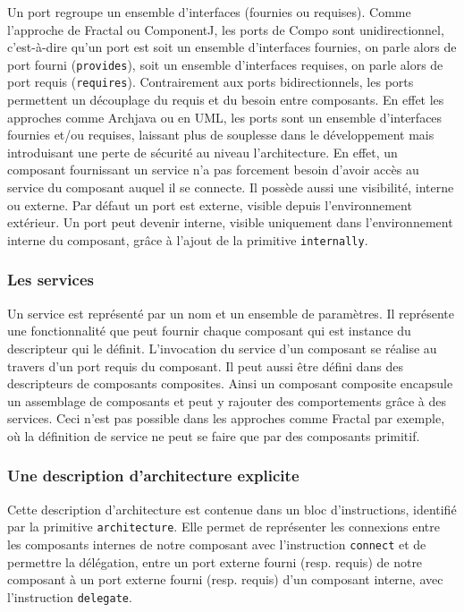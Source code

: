      Un port regroupe un ensemble d'interfaces (fournies ou requises). Comme l'approche de Fractal ou ComponentJ, les ports de Compo sont unidirectionnel, c'est-à-dire qu'un port est soit un ensemble d'interfaces fournies, on parle alors de port fourni (\texttt{provides}), soit un ensemble d'interfaces requises, on parle alors de port requis (\texttt{requires}). Contrairement aux ports bidirectionnels, les ports permettent un découplage du requis et du besoin entre composants. En effet les approches comme Archjava ou en UML, les ports sont un ensemble d'interfaces fournies et/ou requises, laissant plus de souplesse dans le développement mais introduisant une perte de sécurité au niveau l'architecture. En effet, un composant fournissant un service n'a pas forcement besoin d'avoir accès au service du composant auquel il se connecte. Il possède aussi une visibilité, interne ou externe. Par défaut un port est externe, visible depuis l'environnement extérieur. Un port peut devenir interne, visible uniquement dans l'environnement interne du composant, grâce à l'ajout de la primitive \texttt{internally}.
    
    \subsubsection{Les services}
    
    Un service est représenté par un nom et un ensemble de paramètres. Il représente une fonctionnalité que peut fournir chaque composant qui est instance du descripteur qui le définit. L'invocation du service d'un composant se réalise au travers d'un port requis du composant. Il peut aussi être défini dans des descripteurs de composants composites. Ainsi un composant composite encapsule un assemblage de composants et peut y rajouter des comportements grâce à des services. Ceci n'est pas possible dans les approches comme Fractal par exemple, où la définition de service ne peut se faire que par des composants primitif.
    
    \subsubsection{Une description d'architecture explicite}
      
      Cette description d'architecture est contenue dans un bloc d'instructions, identifié par la primitive \texttt{architecture}. Elle permet de représenter les connexions entre les composants internes de notre composant avec l’instruction \texttt{connect} et de permettre la délégation, entre un port externe fourni (resp. requis) de notre composant à un port externe fourni (resp. requis) d'un composant interne, avec l'instruction \texttt{delegate}.
      
